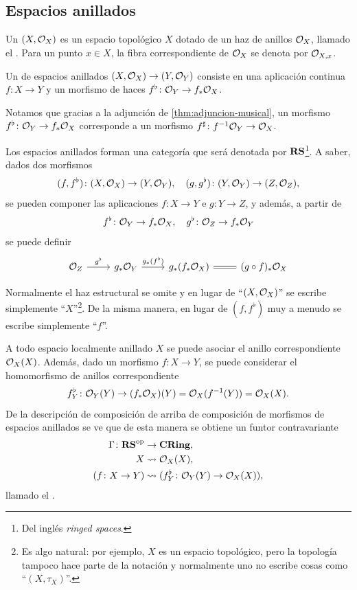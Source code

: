 \documentclass{article}
\numberwithin{equation}{section}
\theoremstyle{definition}
\begin{document}
\subsection{Espacios anillados}

\begin{definicion}
  \label{dfn:espacios-anillados}
  Un  $(X, \mathcal{O}_X)$ es un espacio topológico $X$ dotado
  de un haz de anillos $\mathcal{O}_X$, llamado el . Para un punto
  $x \in X$, la fibra correspondiente de $\mathcal{O}_X$ se denota por $\mathcal{O}_{X,x}$.

  Un  de espacios anillados $(X, \mathcal{O}_X)\to (Y, \mathcal{O}_Y)$ consiste en
  una aplicación continua $f\colon X\to Y$ y un morfismo de haces
  $f^\flat\colon \mathcal{O}_Y \to f_* \mathcal{O}_X$.
\end{definicion}

Notamos que gracias a la adjunción de \ref{thm:adjuncion-musical}, un morfismo
${f^\flat\colon \mathcal{O}_Y \to f_* \mathcal{O}_X}$ corresponde a un morfismo
${f^\sharp\colon f^{-1} \mathcal{O}_Y \to \mathcal{O}_X}$.

Los espacios anillados forman una categoría que será denotada por
$\text{\bf RS}$\footnote{Del inglés \emph{ringed spaces}.}. A saber, dados
dos morfismos
\[ (f,f^\flat)\colon (X, \mathcal{O}_X) \to (Y, \mathcal{O}_Y), \quad
   (g,g^\flat)\colon (Y, \mathcal{O}_Y) \to (Z, \mathcal{O}_Z), \]
se pueden componer las aplicaciones $f\colon X\to Y$ e $g\colon Y\to Z$, y
además, a partir de
$$f^\flat\colon \mathcal{O}_Y \to f_* \mathcal{O}_X, \quad g^\flat\colon \mathcal{O}_Z \to f_* \mathcal{O}_Y$$
se puede definir
\[ \begin{tikzcd}
\O_Z \ar{r}{g^\flat} & g_* \O_Y \ar{r}{g_* (f^\flat)} & g_* (f_* \O_X) \ar[equals]{r} & (g\circ f)_* \O_X
\end{tikzcd} \]

Normalmente el haz estructural se omite y en lugar de ``$(X,\mathcal{O}_X)$'' se escribe
simplemente ``$X$''\footnote{Es algo natural: por ejemplo, $X$ es un espacio
  topológico, pero la topología tampoco hace parte de la notación y normalmente
  uno no escribe cosas como ``$(X, \tau_X)$''.}. De la misma manera, en lugar
de $(f,f^\flat)$ muy a menudo se escribe simplemente ``$f$''.

\begin{definicion}
  \label{dfn:funtor-de-secciones-globales}
  A todo espacio localmente anillado $X$ se puede asociar el anillo
  correspondiente $\mathcal{O}_X (X)$. Además, dado un morfismo $f\colon X \to Y$,
  se puede considerar el homomorfismo de anillos correspondiente
  $$f^\flat_Y\colon \mathcal{O}_Y (Y) \to (f_* \mathcal{O}_X) (Y) = \mathcal{O}_X (f^{-1} (Y)) = \mathcal{O}_X (X).$$
  De la descripción de composición de arriba de composición de morfismos
  de espacios anillados se ve que de esta manera se obtiene un funtor
  contravariante
  \begin{align*}
    \Gamma\colon \text{\bf RS}^\mathrm{op} & \to \text{\bf CRing},\\
    X & \rightsquigarrow \mathcal{O}_X (X),\\
    (f\colon X \to Y) & \rightsquigarrow (f^\flat_Y\colon \mathcal{O}_Y (Y) \to \mathcal{O}_X (X)),
  \end{align*}
  llamado el .
\end{definicion}
\end{document}

